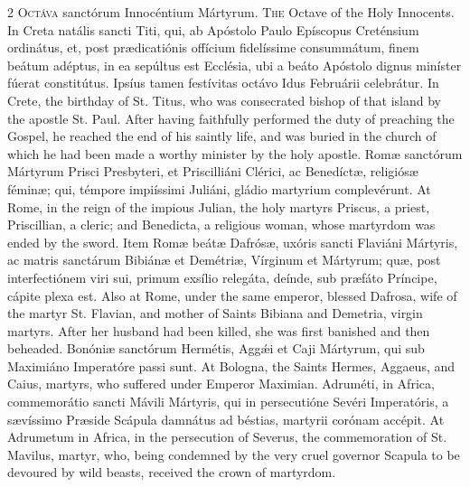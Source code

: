 \begin{paracol}{2}
\lettrine[lines=1]{O}{ctáva} sanctórum Innocéntium Mártyrum.
\switchcolumn
{}
\lettrine[lines=1]{T}{he} Octave of the Holy Innocents.
\switchcolumn*
{}
In Creta natális sancti Titi, qui, ab Apóstolo Paulo Epíscopus Creténsium 
 ordinátus, et, post prædicatiónis offícium 
 fidelíssime consummátum, finem beátum adéptus, in ea sepúltus est Ecclésia, 
 ubi a beáto Apóstolo dignus miníster fúerat constitútus. Ipsíus tamen 
 festívitas octávo Idus Februárii celebrátur.
\switchcolumn
{}
In Crete, the birthday of St. Titus, who was consecrated bishop of that 
 island by the apostle St. Paul. After having faithfully performed the 
 duty of preaching the Gospel, he reached the end of his saintly life, and 
 was buried in the church of which he had been made a worthy minister by the 
 holy apostle.
\switchcolumn*
{}
Romæ sanctórum Mártyrum Prisci Presbyteri, et 
 Priscilliáni Clérici, ac Benedíctæ, religiósæ féminæ; qui, témpore 
 impiíssimi Juliáni, gládio martyrium complevérunt.
\switchcolumn
{}
At Rome, in the reign of the impious Julian, the holy martyrs Priscus, a 
 priest, Priscillian, a cleric; and Benedicta, a religious woman, whose 
 martyrdom was ended by the sword.
\switchcolumn*
{}
Item Romæ beátæ Dafrósæ, uxóris sancti Flaviáni 
 Mártyris, ac matris sanctárum Bibiánæ et Demétriæ, Vírginum et Mártyrum; quæ, 
 post interfectiónem viri sui, primum exsílio relegáta, deínde, sub præfáto 
 Príncipe, cápite plexa est.
\switchcolumn
{}
Also at Rome, under the same emperor, blessed Dafrosa, wife of the martyr 
 St. Flavian, and mother of Saints Bibiana and Demetria, virgin martyrs. 
 After her husband had been killed, she was first banished and then beheaded.
\switchcolumn*
{}
Bonóniæ sanctórum Hermétis, Aggǽi et Caji 
 Mártyrum, qui sub Maximiáno Imperatóre passi sunt.
\switchcolumn
{}
At Bologna, the Saints Hermes, Aggaeus, and Caius, martyrs, who suffered 
 under Emperor Maximian.
\switchcolumn*
{}
Adruméti, in Africa, commemorátio sancti Mávili 
 Mártyris, qui in persecutióne Sevéri Imperatóris, a sævíssimo Præside 
 Scápula damnátus ad béstias, martyrii corónam accépit.
\switchcolumn
{}
At Adrumetum in Africa, in the persecution of Severus, the commemoration of 
 St. Mavilus, martyr, who, being condemned by the very cruel governor Scapula 
 to be devoured by wild beasts, received the crown of martyrdom.

\end{paracol}
